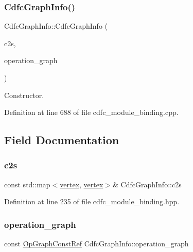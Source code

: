 \subsubsection{\texorpdfstring{Cdfc\+Graph\+Info()}{CdfcGraphInfo()}}
{\footnotesize\ttfamily Cdfc\+Graph\+Info\+::\+Cdfc\+Graph\+Info (\begin{DoxyParamCaption}\item[{const std\+::map$<$ \hyperlink{graph_8hpp_abefdcf0544e601805af44eca032cca14}{vertex}, \hyperlink{graph_8hpp_abefdcf0544e601805af44eca032cca14}{vertex} $>$ \&}]{c2s,  }\item[{const \hyperlink{op__graph_8hpp_a9a0b240622c47584bee6951a6f5de746}{Op\+Graph\+Const\+Ref}}]{operation\+\_\+graph }\end{DoxyParamCaption})}



Constructor. 



Definition at line 688 of file cdfc\+\_\+module\+\_\+binding.\+cpp.



\subsection{Field Documentation}
\mbox{\label{structCdfcGraphInfo_afb6c30bdac24d23936bb456ba4876238}} 
\subsubsection{\texorpdfstring{c2s}{c2s}}
{\footnotesize\ttfamily const std\+::map$<$\hyperlink{graph_8hpp_abefdcf0544e601805af44eca032cca14}{vertex}, \hyperlink{graph_8hpp_abefdcf0544e601805af44eca032cca14}{vertex}$>$\& Cdfc\+Graph\+Info\+::c2s}



Definition at line 235 of file cdfc\+\_\+module\+\_\+binding.\+hpp.

\mbox{\label{structCdfcGraphInfo_ae5cfdb811e7bb8c91b2b593280300f5c}} 
\subsubsection{\texorpdfstring{operation\+\_\+graph}{operation\_graph}}
{\footnotesize\ttfamily const \hyperlink{op__graph_8hpp_a9a0b240622c47584bee6951a6f5de746}{Op\+Graph\+Const\+Ref} Cdfc\+Graph\+Info\+::operation\+\_\+graph}



